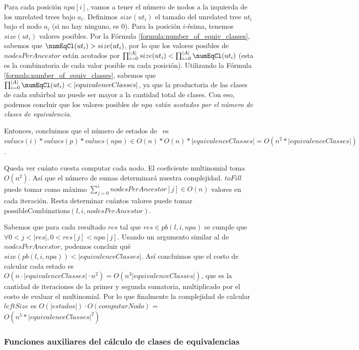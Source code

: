Para cada posición $npa[i]$, vamos a tener el número de nodos a la izquierda de los unrelated trees bajo $a_i$. Definimos $size(ut_i)$ el tamaño del unrelated tree $ut_i$ bajo el nodo $a_i$ (si no hay ninguno, es 0). Para la posición $i$-ésima, tenemos $size(ut_i)$ valores posibles. Por la Fórmula \ref{formula:number_of_equiv_classes}, sabemos que $\numEqCl(ut_i) > size(ut_i)$, por lo que los valores posibles de $nodesPerAncestor$ están acotados por $\prod_{i=0}^{|A|} size(ut_i) < \prod_{i=0}^{|A|} \numEqCl(ut_i)$ (esta es la combinatoria de cada valor posible en cada posición). Utilizando la Fórmula \ref{formula:number_of_equiv_classes}, sabemos que $\prod_{i=0}^{|A|} \numEqCl(ut_i) < |equivalenceClasses|$, ya que la productoria de las clases de cada subárbol no puede ser mayor a la cantidad total de clases. Con eso, podemos concluir que los valores posibles de $npa$ \emph{están acotados por el número de clases de equivalencia}.

Entonces, concluimos que el número de estados de \leftPossibleOrders \ es $values(i) * values(p) * values(npa) \in O(n) * O(n) * |equivalenceClasses| = O(n^2 * |equivalenceClasses|)$.

Queda ver cuánto cuesta computar cada nodo. El coeficiente multinomial toma $O(n^2)$. Así que el número de sumas determinará nuestra complejidad. $toFill$ puede tomar como máximo $\sum_{j=0}^i nodesPerAncestor[j] \in O(n)$ valores en cada iteración. Resta determinar cuántos valores puede tomar $\mathrm{possibleCombinations}(l,i,nodesPerAncestor)$.

Sabemos que para cada resultado $res$ tal que $res \in pb(l,i,npa)$ se cumple que $\forall 0<j<|res|, 0<res[j]<npa[j]$. Usando un argumento similar al de $nodesPerAncestor$, podemos concluir qué $size(pb(l,i,npa)) < |equivalenceClasses|$. Así concluimos que el costo de calcular cada estado es $O(n \cdot |equivalenceClasses| \cdot n^2) = O(n^3 |equivalenceClasses|) $, que es la cantidad de iteraciones de la primer y segunda sumatoria, multiplicado por el costo de evaluar el multinomial. Por lo que finalmente la complejidad de calcular $leftSize$ es $O(|estados|)\cdot O(computarNodo)$ = $O(n^5 * |equivalenceClasses|^2)$

\subsubsection{Funciones auxiliares del cálculo de clases de equivalencias} \label{subsubSection:auxiliaryFormulasEquivalenceClasses}

